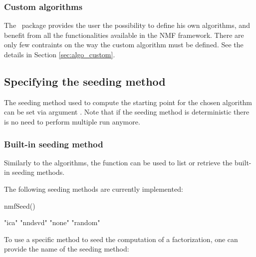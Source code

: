 \documentclass[a4paper]{article}
\newcommand{\nmfpack}{\code{NMF}\ }
\begin{document}
%
%
%


\subsubsection{Custom algorithms}
The \nmfpack package provides the user the possibility to define his own algorithms, 
and benefit from all the functionalities available in the NMF framework.
There are only few contraints on the way the custom algorithm must be defined.
See the details in Section \ref{sec:algo_custom}.

\subsection{Specifying the seeding method}\label{sec:seed}
The seeding method used to compute the starting point for the chosen 
algorithm can be set via argument . Note that if the seeding method is 
deterministic there is no need to perform multiple run anymore.

\subsubsection{Built-in seeding method}
Similarly to the algorithms, the  function can be used to list or 
retrieve the built-in seeding methods.

The following seeding methods are currently implemented:

\begin{Schunk}
\begin{Sinput}
 nmfSeed()
\end{Sinput}
\begin{Soutput}
[1] "ica"    "nndsvd" "none"   "random"
\end{Soutput}
\end{Schunk}

To use a specific method to seed the computation of a factorization, one can 
provide the name of the seeding method:
\end{document}
